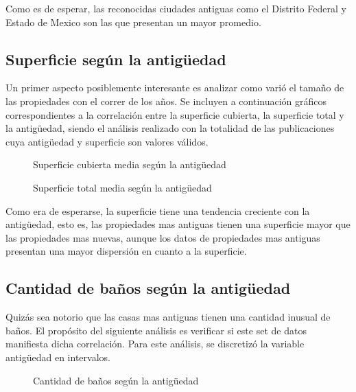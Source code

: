 \documentclass[
10pt, %
a4paper, %
oneside, %
headinclude,footinclude, %
BCOR5mm, %
]{scrartcl}
\begin{document}
    Como es de esperar, las reconocidas ciudades antiguas como el Distrito Federal y Estado de Mexico son las que presentan un mayor promedio.
    
    \subsection{Superficie según la antigüedad}
    Un primer aspecto posiblemente interesante es analizar como varió el tamaño de las propiedades con el correr de los años. Se incluyen a continuación gráficos correspondientes a la correlación entre la superficie cubierta, la superficie total y la antigüedad, siendo el análisis realizado con la totalidad de las publicaciones cuya antigüedad y superficie son valores válidos.
    
    \begin{figure}[H]
        \caption{Superficie cubierta media según la antigüedad}
        \label{fig:superficie-cubierta-antiguedad}
    \end{figure}
    
    \begin{figure}[H]
        \caption{Superficie total media según la antigüedad}
        \label{fig:superficie-total-antiguedad}
    \end{figure}

    Como era de esperarse, la superficie tiene una tendencia creciente con la antigüedad, esto es, las propiedades mas antiguas tienen una superficie mayor que las propiedades mas nuevas, aunque los datos de propiedades mas antiguas presentan una mayor dispersión en cuanto a la superficie.
    
    
    \subsection{Cantidad de baños según la antigüedad}
    Quizás sea notorio que las casas mas antiguas tienen una cantidad inusual de baños. El propósito del siguiente análisis es verificar si este set de datos manifiesta dicha correlación. Para este análisis, se discretizó la variable antigüedad en intervalos. 
    
    \begin{figure}[H]
        \caption{Cantidad de baños según la antigüedad}
        \label{fig:banios-antiguedad}
    \end{figure}
    
\end{document}
